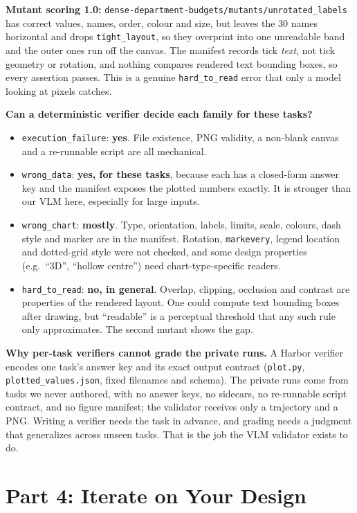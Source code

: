 \documentclass[11pt]{article}
\begin{document}
\textbf{Mutant scoring 1.0:}
\texttt{dense-department-budgets/mutants/unrotated\_labels} has correct values,
names, order, colour and size, but leaves the 30 names horizontal and drops
\texttt{tight\_layout}, so they overprint into one unreadable band and the outer
ones run off the canvas. The manifest records tick \emph{text}, not tick
geometry or rotation, and nothing compares rendered text bounding boxes, so
every assertion passes. This is a genuine \texttt{hard\_to\_read} error that
only a model looking at pixels catches.

\textbf{Can a deterministic verifier decide each family for these tasks?}
\begin{itemize}
\item \texttt{execution\_failure}: \textbf{yes}. File existence, PNG
validity, a non-blank canvas and a re-runnable script are all mechanical.
\item \texttt{wrong\_data}: \textbf{yes, for these tasks}, because each has a
closed-form answer key and the manifest exposes the plotted numbers exactly.
It is stronger than our VLM here, especially for large inputs.
\item \texttt{wrong\_chart}: \textbf{mostly}. Type, orientation, labels, limits,
scale, colours, dash style and marker are in the manifest. Rotation,
\texttt{markevery}, legend location and dotted-grid style were not checked,
and some design properties (e.g.\ ``3D'', ``hollow centre'') need
chart-type-specific readers.
\item \texttt{hard\_to\_read}: \textbf{no, in general}. Overlap, clipping,
occlusion and contrast are properties of the rendered layout. One could
compute text bounding boxes after drawing, but ``readable'' is a perceptual
threshold that any such rule only approximates. The second mutant shows the gap.
\end{itemize}
\textbf{Why per-task verifiers cannot grade the private runs.} A Harbor verifier
encodes one task's answer key and its exact output contract (\texttt{plot.py},
\texttt{plotted\_values.json}, fixed filenames and schema). The private runs come
from tasks we never authored, with no answer keys, no sidecars, no re-runnable
script contract, and no figure manifest; the validator receives only a
trajectory and a PNG. Writing a verifier needs the task in advance, and grading
needs a judgment that generalizes across unseen tasks. That is the job the VLM
validator exists to do.

\section{Part 4: Iterate on Your Design}
\end{document}
